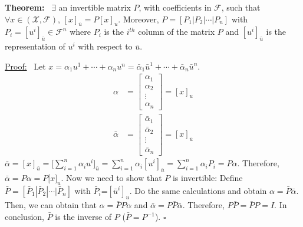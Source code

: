\documentclass[letterpaper]{article}
\begin{document}
\noindent \textbf{Theorem:}~ $\exists$ an invertible matrix $P$, with coefficients in $\mathcal{F}$, such that $\forall x\in(\mathcal{X},\mathcal{F})$, $[x]_{\bar{u}}=P[x]_u$.
    \newline
    Moreover, $P=\left[P_1|P_2|\dotsb|P_n\right]$ with $P_i=[u^i]_{\bar{u}}\in\mathcal{F}^{n}$ where $P_i$ is the $i^{th}$ column of the matrix $P$ and $[u^i]_{\bar{u}}$ is the representation of $u^i$ with respect to $\bar{u}$.

\noindent \underline{Proof:}~ Let $x=\alpha_1u^1+\dotsb+\alpha_nu^n=\bar{\alpha}_1\bar{u}^1+\dotsb+\bar{\alpha}_n\bar{u}^n$.
    \begin{align*}
        \alpha&=\begin{bmatrix}\alpha_{1}\\
            \alpha_{2}\\
            \vdots\\
            \alpha_{n}
        \end{bmatrix}=[x]_{u}\\
        \bar{\alpha}&=\begin{bmatrix}\bar{\alpha}_{1}\\
            \bar{\alpha}_{2}\\
            \vdots\\
            \bar{\alpha}_{n}
        \end{bmatrix}=[x]_{\bar{u}}
    \end{align*}
    $\bar{\alpha}=[x]_{\bar{u}}=\Big[ \displaystyle\sum_{i=1}^{n}\alpha_{i}u^{i}\Big]_{\bar{u}}=\displaystyle\sum_{i=1}^{n}\alpha_{i}[u^{i}]_{\bar{u}}=\displaystyle\sum_{i=1}^{n}\alpha_{i} P_{i}=P\alpha$.
    \newline
    Therefore, $\bar{\alpha} = P\alpha = P{[}x{]}_{u}$.
    \newline\newline
    Now we need to show that $P$ is invertible:
    \newline
    Define $\bar{P} = [\bar{P}_{1}|\bar{P}_{2}| \dotsb  |\bar{P}_{n}]$ with $\bar{P}_{i}$=$[\bar{u}^{i}]_{u}$.
    \newline
    Do the same calculations and obtain $\alpha=\bar{P}\bar{\alpha}$.
    \newline
    Then, we can obtain that $\alpha=\bar{P}P\alpha$ and $\bar{\alpha}=P\bar{P}\bar{\alpha}$.
    \newline
    Therefore, $P\bar{P} = \bar{P}P = I$.
    \newline
    In conclusion, $\bar{P}$ is the inverse of $P$ ($ \bar{P}=P^{-1}$). $\square$
\end{document}
